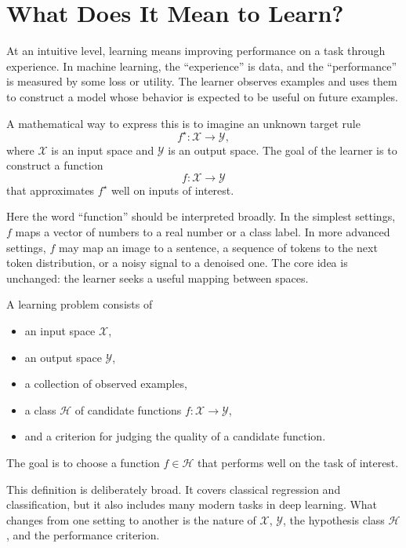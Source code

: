 \section{What Does It Mean to Learn?}

At an intuitive level, learning means improving performance on a task through experience. In machine learning, the ``experience'' is data, and the ``performance'' is measured by some loss or utility. The learner observes examples and uses them to construct a model whose behavior is expected to be useful on future examples.

A mathematical way to express this is to imagine an unknown target rule
\[
f^\star : \mathcal{X} \to \mathcal{Y},
\]
where $\mathcal{X}$ is an input space and $\mathcal{Y}$ is an output space. The goal of the learner is to construct a function
\[
f : \mathcal{X} \to \mathcal{Y}
\]
that approximates $f^\star$ well on inputs of interest.

Here the word ``function'' should be interpreted broadly. In the simplest settings, $f$ maps a vector of numbers to a real number or a class label. In more advanced settings, $f$ may map an image to a sentence, a sequence of tokens to the next token distribution, or a noisy signal to a denoised one. The core idea is unchanged: the learner seeks a useful mapping between spaces.

\begin{definition}
A learning problem consists of
\begin{itemize}
    \item an input space $\mathcal{X}$,
    \item an output space $\mathcal{Y}$,
    \item a collection of observed examples,
    \item a class $\mathcal{H}$ of candidate functions $f : \mathcal{X} \to \mathcal{Y}$,
    \item and a criterion for judging the quality of a candidate function.
\end{itemize}
The goal is to choose a function $f \in \mathcal{H}$ that performs well on the task of interest.
\end{definition}

This definition is deliberately broad. It covers classical regression and classification, but it also includes many modern tasks in deep learning. What changes from one setting to another is the nature of $\mathcal{X}$, $\mathcal{Y}$, the hypothesis class $\mathcal{H}$, and the performance criterion.

